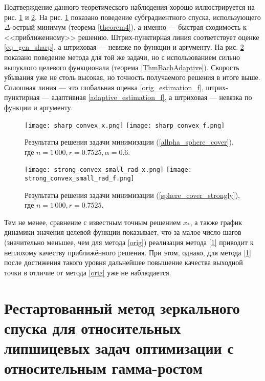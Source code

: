    Подтверждение данного теоретического наблюдения хорошо иллюстрируется на рис. \ref{res_sharp_convex} и \ref{res_strong_convex}. На рис. \ref{res_sharp_convex} показано поведение субградиентного спуска, использующего $\Delta$-острый минимум (теорема \ref{theorem4}), а именно --- быстрая сходимость к <<приближенному>> решению. Штрих-пунктирная линия соответствует оценке \eqref{eq_gen_sharp}, а штриховая --- невязке по функции и аргументу. На рис. \ref{res_strong_convex} показано поведение метода для той же задачи, но с использованием сильно выпуклого целевого функционала (теорема \ref{ThmBachAdaptive}). Скорость убывания уже не столь высокая, но точность получаемого решения в итоге выше. Сплошная линия --- это глобальная оценка \eqref{orig_estimation_f}, штрих-пунктирная --- адаптивная \eqref{adaptive_estimation_f}, а штриховая --- невязка по функции и аргументу.

    \begin{figure}[h]
        \texttt{[image: sharp\_convex\_x.png]}
        \endminipage\hfill
        \texttt{[image: sharp\_convex\_f.png]}
        \endminipage\hfill
        \caption{ Результаты решения задачи минимизации (\ref{allpha_sphere_cover}), где  $n= 1\,000, r = 0.7525, \alpha = 0.6$.}
        \label{res_sharp_convex}
    \end{figure}

    \begin{figure}[h]
        \texttt{[image: strong\_convex\_small\_rad\_x.png]}
        \endminipage\hfill
        \texttt{[image: strong\_convex\_small\_rad\_f.png]}
        \endminipage\hfill
        \caption{ Результаты решения задачи минимизации (\ref{sphere_cover_strongly}), где  $n= 1\,000, r = 0.7525$.}
        \label{res_strong_convex}
    \end{figure}

    Тем не менее, сравнение с известным точным решением $x_*$, а также график динамики значения целевой функции показывает, что за малое число шагов (значительно меньшее, чем для метода \eqref{orig}) реализация метода \eqref{1} приводит к неплохому качеству приближённого решения. При этом, однако, для метода \eqref{1} после достижения такого уровня дальнейшее повышение качества выходной точки в отличие от метода \eqref{orig} уже не наблюдается.


\section{Рестартованный метод зеркального спуска для относительных липшицевых задач оптимизации с относительным гамма-ростом}\label{sec:ch3/sect3}

